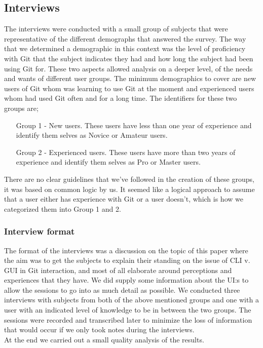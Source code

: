 \documentclass[a4paper,oneside]{bth} %
\begin{document}
				
				\subsection{Interviews}
				The interviews were conducted with a small group of subjects that were representative of the different demographs that answered the survey. The way that we determined a demographic in this context was the level of proficiency with Git that the subject indicates they had and how long the subject had been using Git for. 
				These two aspects allowed analysis on a deeper level, of the needs and wants of different user groups. The minimum demographics to cover are new users of Git whom was learning to use Git at the moment and experienced users whom had used Git often and for a long time. The identifiers for these two groups are;
				\begin{itemize}
					\item[Group 1 - New users.]
					These users have less than one year of experience and identify them selves as Novice or Amateur users.
					\item[Group 2 - Experienced users.]
					These users have more than two years of experience and identify them selves as Pro or Master users.
				\end{itemize}
				There are no clear guidelines that we've followed in the creation of these groups, it was based on common logic by us. It seemed like a logical approach to assume that a user either has experience with Git or a user doesn't, which is how we categorized them into Group 1 and 2.
				
					\subsubsection*{Interview format}
					The format of the interviews was a discussion on the topic of this paper where the aim was to get the subjects to explain their standing on the issue of CLI v. GUI in Git interaction, and most of all elaborate around perceptions and experiences that they have. We did supply some information about the UI:s to allow the sessions to go into as much detail as possible. 
					We conducted three interviews with subjects from both of the above mentioned groups and one with a user with an indicated level of knowledge to be in between the two groups. The sessions were recorded and transcribed later to minimize the loss of information that would occur if we only took notes during the interviews.\\
					At the end we carried out a small quality analysis of the results.
					
\end{document}
